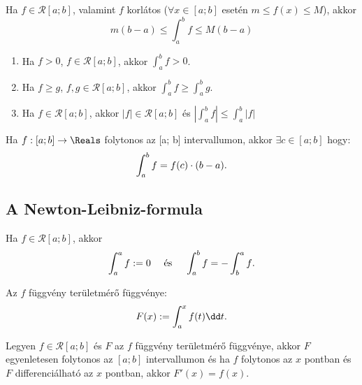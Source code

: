 \begin{theorem}
  Ha $f \in \mathcal R [a; b]$, valamint $f$ korlátos ($\forall x \in [a; b]$ esetén $m \leq
    f(x) \leq M$), akkor
  \[
    m(b - a) \leq \int_a^b f \leq M(b - a)
  \]

  \begin{enumerate}
    \item Ha $f > 0$, $f \in \mathcal R [a; b]$, akkor $\displaystyle \int_a^b f
            > 0$.

    \item Ha $f \geq g$, $f, g \in \mathcal R [a; b]$, akkor $\displaystyle
            \int_a^b f \geq \int_a^b g$.

    \item Ha $f \in \mathcal R [a; b]$, akkor $|f| \in \mathcal R [a; b]$ és
          $\displaystyle \left| \int_a^b f \right| \leq \int_a^b |f|$
  \end{enumerate}
\end{theorem}

\begin{theorem}
  Ha $f: [a; b] \rightarrow \Reals$ folytonos az [a; b] intervallumon, akkor
  $\exists c \in [a; b]$ hogy:
  \[
    \int_a^b f = f(c) \cdot (b - a)
    \text.
  \]
\end{theorem}

\subsection{A Newton-Leibniz-formula}

\begin{definition}
  Ha $f \in \mathcal R [a; b]$, akkor
  \[
    \int_a^a f := 0
    \quad \text{ és } \quad
    \int_a^b f = - \int_b^a f
    \text.
  \]
\end{definition}

\begin{definition}
  Az $f$ függvény területmérő függvénye:
  \[
    F(x) := \int_a^x f(t) \dd t
    \text.
  \]
\end{definition}

\begin{theorem}
  Legyen $f \in \mathcal R [a; b]$ és $F$ az $f$ függvény területmérő függvénye,
  akkor $F$ egyenletesen folytonos az $[a; b]$ intervallumon és ha $f$ folytonos
  az $x$ pontban és $F$ differenciálható az $x$ pontban, akkor $F'(x) = f(x)$.
\end{theorem}


